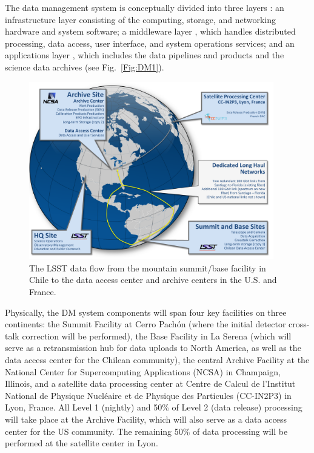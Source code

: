 \documentclass[11pt,twoside]{article}
\begin{document}
The data management system is conceptually divided into three layers
\citep{LDM-148}: an infrastructure layer \citep{LDM-129} consisting of the computing, storage, and
networking hardware and system software; a middleware layer \citep{LDM-152}, which
handles distributed processing, data access, user interface, and
system operations services; and an applications layer
\citep{LDM-151,LDM-135,LDM-131}, which includes
the data pipelines and products and the science data archives (see
Fig.~\ref{Fig:DM1}).

\begin{figure}[!t]
%
%
\begin{center}
\includegraphics[width=0.95\textwidth,clip]{DMX2.pdf}
\end{center}
\caption{The LSST data flow from the mountain summit/base facility in
Chile to the data access center and archive centers in the U.S. and France.}
\label{Fig:DM2}
\end{figure}

Physically, the DM system components will span four key facilities on three
continents: the Summit Facility at  Cerro Pach\'on (where the initial
detector cross-talk
correction will be performed), the Base Facility in La Serena (which will serve
as a retransmission hub for data
uploads to North America, as well as the data access center for the Chilean
community), the central Archive Facility at the National Center
for Supercomputing Applications (NCSA) in Champaign, Illinois, and a
satellite data processing center at Centre de Calcul de l'Institut National
de Physique Nucl\'{e}aire et de Physique des Particules (CC-IN2P3) in Lyon, France.
All Level 1 (nightly) and 50\% of Level 2 (data release) processing will take place at the
Archive Facility, which will also serve as a data access center
for the US community. The remaining 50\% of data processing will be performed at
the satellite center in Lyon.
\end{document}
